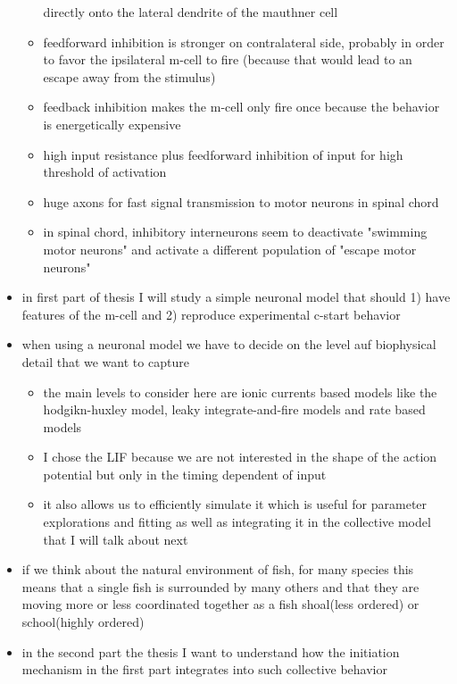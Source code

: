 \documentclass[a4paper,10pt,hidelinks]{scrreprt}
\begin{document}
\begin{itemize}
\begin{itemize}
		directly 
		onto the lateral dendrite of the mauthner cell
		\item feedforward inhibition is stronger on contralateral side, 
		probably in 
		order to favor the ipsilateral m-cell to fire (because that would lead 
		to an escape away from the stimulus)
		\item feedback inhibition makes the m-cell only fire once because the 
		behavior is energetically expensive
		\item high input resistance plus feedforward inhibition of input for 
		high 
		threshold of activation
		\item huge axons for fast signal transmission to motor neurons in 
		spinal 
		chord
		\item in spinal chord, inhibitory interneurons seem to deactivate 
		"swimming 
		motor neurons" and activate a different population of "escape motor 
		neurons"
		\end{itemize}
		\item in first part of thesis I will study a simple neuronal model that 
		should 1) have features of the m-cell and 2) reproduce experimental 
		c-start behavior
		\item when using a neuronal model we have to decide on the level auf 
		biophysical detail that we want to capture
		\begin{itemize}
		\item the main levels to consider here are ionic currents based models 
		like 
		the hodgikn-huxley model, leaky integrate-and-fire models and rate 
		based models
		\item I chose the LIF because we are not interested in the shape of the 
		action potential but only in the timing dependent of input
		\item it also allows us to efficiently simulate it which is useful for 
		parameter explorations and fitting as well as integrating it in the 
		collective model that I will talk about next
		\end{itemize}
		\item if we think about the natural environment of fish, for many 
		species 
		this means that a single fish is surrounded by many others and that 
		they are moving more or less coordinated together as a fish shoal(less 
		ordered) or school(highly ordered)
		\item in the second part the thesis I want to understand how the 
		initiation 
		mechanism in the first part integrates into such collective behavior
		\begin{itemize}

\end{itemize}
\end{itemize}
\end{document}
